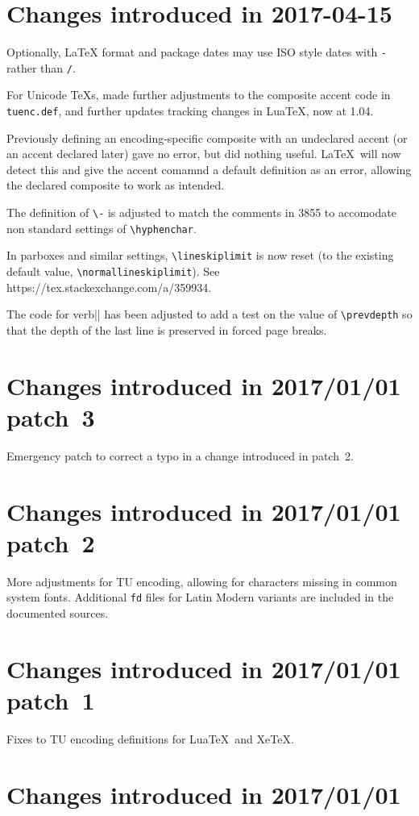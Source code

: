 \documentclass{ltxguide}
\newcommand\gnatsissue[1]{#1}
\newcommand\sxanswer[1]{https://tex.stackexchange.com\slash a\slash #1}
\newcommand\gnatsissue[1]{%
    \href{https://www.latex-project.org/cgi-bin/ltxbugs2html?pr=latex/#1}{#1}}
\newcommand\sxanswer[1]{%
     \url{https://tex.stackexchange.com/a/#1}}
\begin{document}
\section{Changes  introduced in 2017-04-15}
Optionally, \LaTeX{} format and package dates may use ISO style dates with
\texttt{-}  rather than \texttt{/}.

For Unicode \TeX{}s, made further adjustments to the composite accent
code in \texttt{tuenc.def}, and further updates tracking changes in
Lua\TeX, now at 1.04.

Previously defining an encoding-specific composite with an undeclared
accent (or an accent declared later) gave no error, but did nothing useful.
\LaTeX\ will now detect this and give the accent comamnd a default definition
as an error, allowing the declared composite to work as intended.

The definition of \verb|\-| is adjusted to match the comments in
\gnatsissue{3855} to accomodate non standard settings of \verb|\hyphenchar|.

In parboxes and similar settings, \verb|\lineskiplimit| is now
reset (to the existing default value, \verb|\normallineskiplimit|).
See \sxanswer{359934}.

 The code for verb|\newpage| has been adjusted to add a test on the value of
\verb|\prevdepth| so that the depth of the last line is preserved in
forced page breaks.

\section{Changes  introduced in 2017/01/01 patch~3}
Emergency patch to correct a typo in a change introduced in patch~2.

\section{Changes  introduced in 2017/01/01 patch~2}
More adjustments for TU encoding, allowing for characters missing in
common system fonts. Additional \texttt{fd} files
for Latin Modern variants are included in the documented sources.

\section{Changes  introduced in 2017/01/01 patch~1}
Fixes to TU encoding definitions for Lua\TeX\ and Xe\TeX.

\section{Changes  introduced in 2017/01/01}
\end{document}
